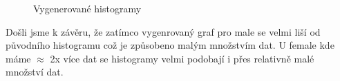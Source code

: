 \documentclass[paper=a4, fontsize=12pt]{scrartcl}
\numberwithin{equation}{section}		%
\numberwithin{figure}{section}			%
\numberwithin{table}{section}				%
\begin{document}
\begin{figure}[H]
  \centering
  \qquad
  \caption{Vygenerované histogramy}
\end{figure}
Došli jsme k závěru, že zatímco vygenrovaný graf pro male se velmi liší od původního
histogramu což je způsobeno malým množstvím dat. U female kde máme $\approx$ 2x více dat se histogramy
velmi podobají i přes relativně malé množství dat.
\newpage
\end{document}
